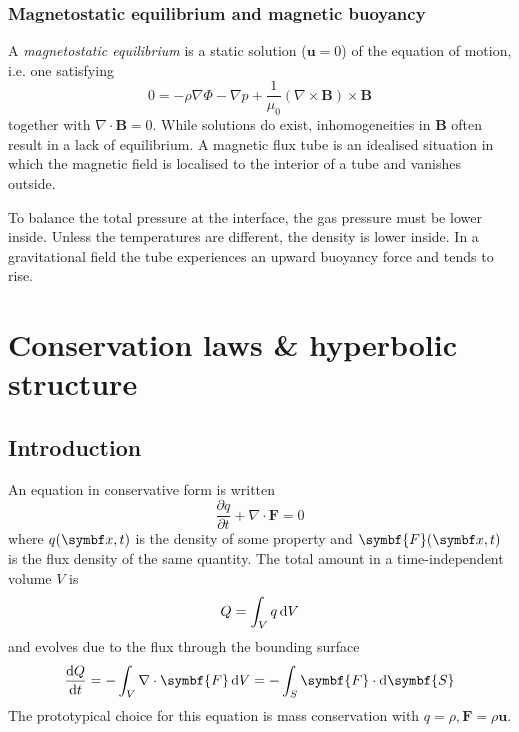 \documentclass{jknotes}
\newcommand{\B}{\symbf{B}}
\renewcommand{\u}{\symbf{u}}
\begin{document}
\subsubsection{Magnetostatic equilibrium and magnetic buoyancy}
A \emph{magnetostatic equilibrium} is a static solution ($\u = 0$) of the
equation of motion, i.e. one satisfying
\begin{equation}
	0 = - \rho \nabla \Phi - \nabla p + \frac{1}{\mu_0} (\nabla \times \B)
	\times \B
\end{equation}
together with $\nabla \cdot \B = 0$. While solutions do exist, inhomogeneities
in $\B$ often result in a lack of equilibrium. A magnetic flux tube is an
idealised situation in which the magnetic field is localised to the interior
of a tube and vanishes outside.
\begin{center}
\end{center}

To balance the total pressure at the interface, the gas pressure must be lower
inside. Unless the temperatures are different, the density is lower inside. In
a gravitational field the tube experiences an upward buoyancy force and tends
to rise.

\section{Conservation laws \& hyperbolic structure}
\subsection{Introduction}
An equation in conservative form is written
\begin{equation}
	\frac{\partial q}{\partial t} + \nabla \cdot \symbf{F} = 0
\end{equation}
where $q(\x,t)$ is the density of some property and $\symbf{F}(\x,t)$ is the
flux density of the same quantity. The total amount in a time-independent
volume $V$ is
\begin{equation}
	Q = \int_V q \, \diffd V
\end{equation}
and evolves due to the flux through the bounding surface
\begin{equation}
	\frac{\diffd Q}{\diffd t} = - \int_V \nabla \cdot \symbf{F} \, \diffd V =
	- \int_S \symbf{F} \cdot \diffd \symbf{S}
\end{equation}
The prototypical choice for this equation is mass conservation with $q = \rho,
\symbf{F} = \rho \u$. 
\end{document}
